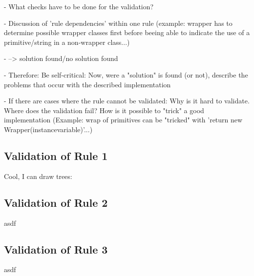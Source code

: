  - What checks have to be done for the validation?
 
 - Discussion of 'rule dependencies' within one rule (example: wrapper has to determine possible wrapper classes first before beeing able to indicate the use of a primitive/string in a non-wrapper class...)
 
  - --> solution found/no solution found
 
  - Therefore: Be self-critical: Now, were a "solution" is found (or not), describe the problems that occur with the described implementation
  
 - If there are cases where the rule cannot be validated: Why is it hard to validate. Where does the validation fail? How is it possible to "trick" a good implementation (Example: wrap of primitives can be "tricked" with 'return new Wrapper(instancevariable)'...) 

\subsection*{Validation of Rule 1}
Cool, I can draw trees: 


\subsection*{Validation of Rule 2}
asdf
\subsection*{Validation of Rule 3}
asdf
